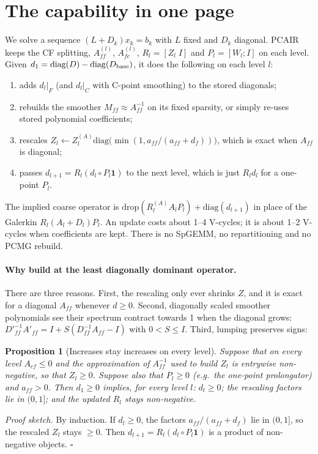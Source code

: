 \documentclass[11pt,a4paper]{article}
\newtheorem{proposition}{Proposition}
\newcommand{\Aff}{A_{ff}}
\begin{document}
\section{The capability in one page}
We solve a sequence $(L+D_k)x_k=b_k$ with $L$ fixed and $D_k$ diagonal. PCAIR keeps the CF splitting, $\Aff^{(l)}$, $A_{fc}^{(l)}$, $R_l=[Z_l\;I]$ and $P_l=[W_l;I]$ on each level. Given $d_1=\mathrm{diag}(D)-\mathrm{diag}(D_{\rm base})$, it does the following on each level $l$:
\begin{enumerate}
\item adds $d_l|_F$ (and $d_l|_C$ with C-point smoothing) to the stored diagonals;
\item rebuilds the smoother $M_{ff}\approx\Aff^{-1}$ on its fixed sparsity, or simply re-uses stored polynomial coefficients;
\item rescales $Z_l\leftarrow Z_l^{(A)}\mathrm{diag}\big(\min(1,a_{ff}/(a_{ff}+d_f))\big)$, which is exact when $\Aff$ is diagonal;
\item passes $d_{l+1}=R_l(d_l\circ P_l\mathbf 1)$ to the next level, which is just $R_l d_l$ for a one-point $P_l$.
\end{enumerate}
The implied coarse operator is $\mathrm{drop}(R_l^{(A)}A_lP_l)+\mathrm{diag}(d_{l+1})$ in place of the Galerkin $R_l(A_l+D_l)P_l$. An update costs about 1--4 V-cycles; it is about 1--2 V-cycles when coefficients are kept. There is no SpGEMM, no repartitioning and no PCMG rebuild.

\paragraph{Why build at the least diagonally dominant operator.} There are three reasons. First, the rescaling only ever shrinks $Z$, and it is exact for a diagonal $\Aff$ whenever $d\ge 0$. Second, diagonally scaled smoother polynomials see their spectrum contract towards 1 when the diagonal grows: $D'^{-1}_{ff}A'_{ff}=I+S(D_{ff}^{-1}\Aff-I)$ with $0<S\le I$. Third, lumping preserves signs:

\begin{proposition}[Increases stay increases on every level]\label{prop:mono}
Suppose that on every level $A_{cf}\le 0$ and the approximation of $\Aff^{-1}$ used to build $Z_l$ is entrywise non-negative, so that $Z_l\ge 0$. Suppose also that $P_l\ge0$ (e.g.\ the one-point prolongator) and $a_{ff}>0$. Then $d_1\ge 0$ implies, for every level $l$: $d_l\ge 0$; the rescaling factors lie in $(0,1]$; and the updated $R_l$ stays non-negative.
\end{proposition}
\noindent\emph{Proof sketch.} By induction. If $d_l\ge0$, the factors $a_{ff}/(a_{ff}+d_f)$ lie in $(0,1]$, so the rescaled $Z_l$ stays $\ge0$. Then $d_{l+1}=R_l(d_l\circ P_l\mathbf 1)$ is a product of non-negative objects. \hfill$\square$
\end{document}
